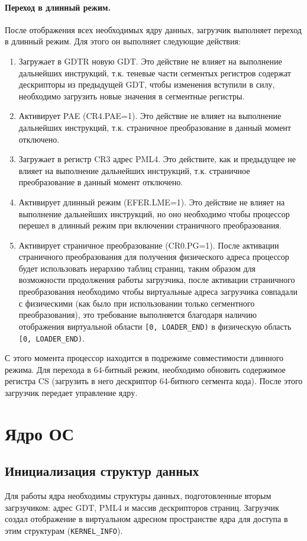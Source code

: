 \paragraph{Переход в длинный режим.} После отображения всех необходимых ядру данных,
загрузчик выполняет переход в длинный режим. Для этого он выполняет следующие действия:
\begin{enumerate}[1.]
\item Загружает в GDTR новую GDT. Это действие не влияет на выполнение дальнейших инструкций,
	т.к. теневые части сегментых регистров содержат дескрипторы из предыдущей GDT, чтобы
	изменения вступили в силу, необходимо загрузить новые значения в сегментные регистры.
\item Активирует PAE (CR4.PAE=1). Это действие не влияет на выполнение дальнейших инструкций,
	т.к. страничное преобразование в данный момент отключено.
\item Загружает в регистр CR3 адрес PML4. Это действите, как и предыдущее не влияет на
	выполнение дальнейших инструкций, т.к. страничное преобразование в данный момент
	отключено.
\item Активирует длинный режим (EFER.LME=1). Это действие не влияет на выполнение дальнейших
	инструкций, но оно необходимо чтобы процессор перешел в длинный режим при включении
	страничного преобразования.
\item Активирует страничное преобразование (CR0.PG=1). После активации страничного преобразования
	для получения физического адреса процессор будет использовать иерархию таблиц страниц,
	таким образом для возможности продолжения работы загрузчика, после активации страничного
	преобразования необходимо чтобы виртуальные адреса загрузчика совпадали с физическими (как
	было при использовании только сегментного преобразования), это требование выполняется
	благодаря наличию отображения виртуальной области \texttt{[0, LOADER\_END)} в физическую область
	\texttt{[0, LOADER\_END)}.
\end{enumerate}

С этого момента процессор находится в подрежиме совместимости длинного режима.
Для перехода в 64-битный режим, необходимо обновить содержимое регистра CS (загрузить в
него дескриптор 64-битного сегмента кода). После этого загрузчик передает управление ядру.

\section{Ядро ОС}

\subsection{Инициализация структур данных}
Для работы ядра необходимы структуры данных, подготовленные вторым загрзучиком:
адрес GDT, PML4 и массив дескрипторов страниц. Загрузчик создал отображение в
виртуальном адресном пространстве ядра для доступа в этим структурам (\texttt{KERNEL\_INFO}).

